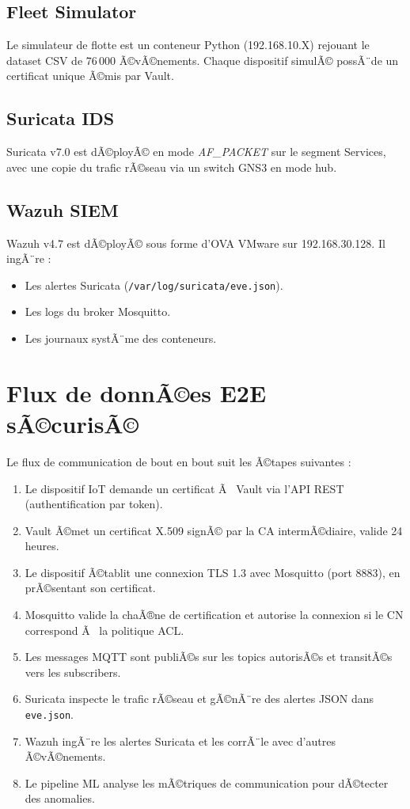 \subsection{Fleet Simulator}

Le simulateur de flotte est un conteneur Python (192.168.10.X) rejouant le dataset CSV de 76\,000 Ã©vÃ©nements. Chaque dispositif simulÃ© possÃ¨de un certificat unique Ã©mis par Vault.

\subsection{Suricata IDS}

Suricata v7.0 est dÃ©ployÃ© en mode \textit{AF\_PACKET} sur le segment Services, avec une copie du trafic rÃ©seau via un switch GNS3 en mode hub.

\subsection{Wazuh SIEM}

Wazuh v4.7 est dÃ©ployÃ© sous forme d'OVA VMware sur 192.168.30.128. Il ingÃ¨re :
\begin{itemize}
  \item Les alertes Suricata (\texttt{/var/log/suricata/eve.json}).
  \item Les logs du broker Mosquitto.
  \item Les journaux systÃ¨me des conteneurs.
\end{itemize}

\section{Flux de donnÃ©es E2E sÃ©curisÃ©}

Le flux de communication de bout en bout suit les Ã©tapes suivantes :

\begin{enumerate}
  \item Le dispositif IoT demande un certificat Ã  Vault via l'API REST (authentification par token).
  \item Vault Ã©met un certificat X.509 signÃ© par la CA intermÃ©diaire, valide 24 heures.
  \item Le dispositif Ã©tablit une connexion TLS 1.3 avec Mosquitto (port 8883), en prÃ©sentant son certificat.
  \item Mosquitto valide la chaÃ®ne de certification et autorise la connexion si le CN correspond Ã  la politique ACL.
  \item Les messages MQTT sont publiÃ©s sur les topics autorisÃ©s et transitÃ©s vers les subscribers.
  \item Suricata inspecte le trafic rÃ©seau et gÃ©nÃ¨re des alertes JSON dans \texttt{eve.json}.
  \item Wazuh ingÃ¨re les alertes Suricata et les corrÃ¨le avec d'autres Ã©vÃ©nements.
  \item Le pipeline ML analyse les mÃ©triques de communication pour dÃ©tecter des anomalies.
\end{enumerate}

